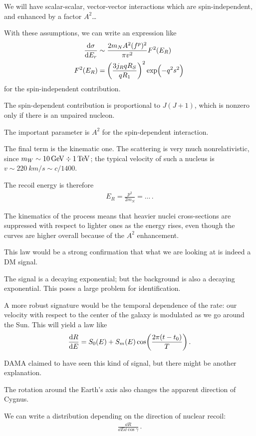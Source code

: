 \documentclass[main.tex]{subfiles}
\begin{document}
We will have scalar-scalar, vector-vector interactions which are spin-independent, and enhanced by a factor \(A^2\)\dots

With these assumptions, we can write an expression like 
%
\begin{align}
\dv{\sigma }{E_r} &\sim \frac{2 m_N A^2 (f^{p})^2}{\pi v^2} F^2(E_R)  \\
F^2 (E_R) &= \qty(\frac{3 j_R q R_S}{q R_1 })^2 \exp(- q^2 s^2)
\,
\end{align}
%
for the spin-independent contribution. 

The spin-dependent contribution is proportional to \(J (J+1)\), which is nonzero only if there is an unpaired nucleon. 

The important parameter is \(A^2\) for the spin-dependent interaction. 

The final term is the kinematic one. 
The scattering is very much nonrelativistic, since \(m_W \sim \SI{10}{GeV} \divisionsymbol \SI{1}{TeV}\); the typical velocity of such a nucleus is \(v \sim \SI{220}{km/s} \sim c / 1400\). 

The recoil energy is therefore 
%
\begin{align}
E_R = \frac{p^2}{2 m_N} = \dots
\,.
\end{align}

The kinematics of the process means that heavier nuclei cross-sections are suppressed with respect to lighter ones as the energy rises, even though the curves are higher overall because of the \(A^2\) enhancement. 

This law would be a strong confirmation that what we are looking at is indeed a DM signal. 

The signal is a decaying exponential; but the background is also a decaying exponential. 
This poses a large problem for identification. 

A more robust signature would be the temporal dependence of the rate: our velocity with respect to the center of the galaxy is modulated as we go around the Sun. 
This will yield a law like 
%
\begin{align}
\dv{R}{E} (E, t) = S_0 (E) + S_m (E) \cos(\frac{2 \pi (t - t_0 )}{T})
\,.
\end{align}

DAMA claimed to have seen this kind of signal, but there might be another explanation. 

The rotation around the Earth's axis also changes the apparent direction of Cygnus. 

We can write a distribution depending on the direction of nuclear recoil: 
%
\begin{align}
\frac{ \dd{R}}{ \dd{E} \dd{\cos \gamma }}
\,.
\end{align}
\end{document}
